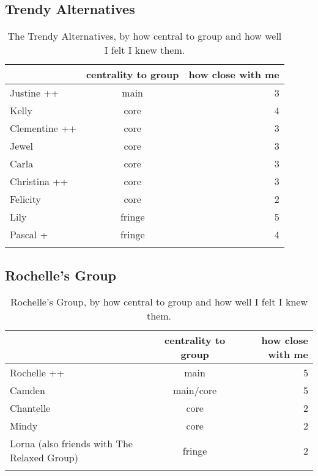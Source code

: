 \subsection{Trendy Alternatives}
\nopagebreak
\begin{table}[ht]
\caption{The Trendy Alternatives, by how central to group and how well I felt I knew them.}	\label{append:Alternatives}
	\centering
		\begin{tabular}{lcr} \\
		\lsptoprule
			\multirow{2}{*}{\sc name} & \multicolumn{1}{p{2cm}}{\centering \sc centrality to group} & \multicolumn{1}{p{1.75cm}}{\centering \sc how close with me}  \\
			\midrule
Justine ++ & main & 3 \\\hline
Kelly & core & 4 \\\hline
Clementine ++ & core & 3 \\\hline
Jewel  & core & 3 \\\hline
Carla  & core & 3 \\\hline
Christina ++ & core & 3 \\\hline
Felicity & core & 2 \\\hline
Lily  & fringe & 5 \\\hline
Pascal +  & fringe & 4 \\

   \lspbottomrule
		\end{tabular}
\end{table}

\subsection{Rochelle's Group}
\nopagebreak
\begin{table}[ht]
\caption{Rochelle's Group, by how central to group and how well I felt I knew them.}	\label{append:Drama}
	\centering
		\begin{tabular}{p{4cm}cr} \\
		\lsptoprule
			\multirow{2}{*}{\sc name} & \multicolumn{1}{p{2cm}}{\centering \sc centrality to group} & \multicolumn{1}{p{1.75cm}}{\centering \sc how close with me}  \\
		\midrule
		Rochelle ++ & main & 5 \\\hline
		Camden   & main/core & 5 \\\hline
		Chantelle & core & 2 \\\hline
		Mindy     & core & 2 \\\hline
		Lorna (also friends with The Relaxed Group)    & fringe & 2 \\
		   \lspbottomrule
	\end{tabular}
\end{table}


